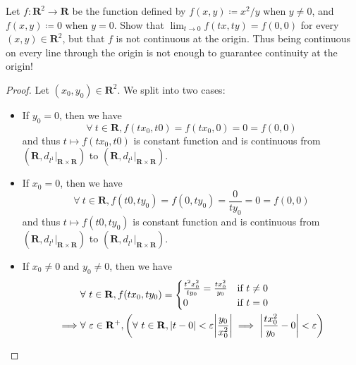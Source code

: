 \begin{exercise}\label{ex 2.2.12}
    Let \(f: \mathbf{R}^2 \to \mathbf{R}\) be the function defined by \(f(x, y) \coloneqq x^2 / y\) when \(y \neq 0\), and \(f(x, y) \coloneqq 0\) when \(y = 0\).
    Show that \(\lim_{t \to 0} f(tx, ty) = f(0, 0)\) for every \((x, y) \in \mathbf{R}^2\), but that \(f\) is not continuous at the origin.
    Thus being continuous on every line through the origin is not enough to guarantee continuity at the origin!
\end{exercise}

\begin{proof}
    Let \((x_0, y_0) \in \mathbf{R}^2\).
    We split into two cases:
    \begin{itemize}
        \item If \(y_0 = 0\), then we have
              \[
                  \forall\ t \in \mathbf{R}, f(t x_0, t0) = f(t x_0, 0) = 0 = f(0, 0)
              \]
              and thus \(t \mapsto f(t x_0, t0)\) is constant function and is continuous from \((\mathbf{R}, d_{l^1}|_{\mathbf{R} \times \mathbf{R}})\) to \((\mathbf{R}, d_{l^1}|_{\mathbf{R} \times \mathbf{R}})\).
        \item If \(x_0 = 0\), then we have
              \[
                  \forall\ t \in \mathbf{R}, f(t0, t y_0) = f(0, t y_0) = \frac{0}{t y_0} = 0 = f(0, 0)
              \]
              and thus \(t \mapsto f(t0, t y_0)\) is constant function and is continuous from \((\mathbf{R}, d_{l^1}|_{\mathbf{R} \times \mathbf{R}})\) to \((\mathbf{R}, d_{l^1}|_{\mathbf{R} \times \mathbf{R}})\).
        \item If \(x_0 \neq 0\) and \(y_0 \neq 0\), then we have
              \begin{align*}
                           & \forall\ t \in \mathbf{R}, f(t x_0, t y_0) = \begin{cases}
                      \frac{t^2 x_0^2}{t y_0} = \frac{t x_0^2}{y_0} & \text{if } t \neq 0 \\
                      0                                             & \text{if } t = 0
                  \end{cases}                                                                                                                     \\
                  \implies & \forall\ \varepsilon \in \mathbf{R}^+, \bigg(\forall\ t \in \mathbf{R}, \abs*{t - 0} < \varepsilon \abs*{\frac{y_0}{x_0^2}} \implies \abs*{\frac{t x_0^2}{y_0} - 0} < \varepsilon\bigg)     \\

\end{align*}
\end{itemize}
\end{proof}

